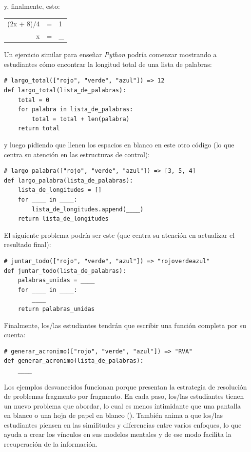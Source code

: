\noindent
y, finalmente, esto:

\begin{center}
\begin{tabular}{rcl}
  (2x + 8)/4    & = &    1    \\
   x        & = &    \_
\end{tabular}
\end{center}

Un ejercicio similar para enseñar \emph{Python} podría comenzar mostrando a estudiantes
cómo encontrar la longitud total de una lista de palabras:

\begin{verbatim}
# largo_total(["rojo", "verde", "azul"]) => 12
def largo_total(lista_de_palabras):
    total = 0
    for palabra in lista_de_palabras:
        total = total + len(palabra)
    return total
\end{verbatim}

\noindent

y luego pidiendo que llenen los espacios en blanco en este otro código
(lo que centra su atención en las estructuras de control):


\begin{verbatim}
# largo_palabra(["rojo", "verde", "azul"]) => [3, 5, 4]
def largo_palabra(lista_de_palabras):
    lista_de_longitudes = []
    for ____ in ____:
        lista_de_longitudes.append(____)
    return lista_de_longitudes
\end{verbatim}

El siguiente problema podría ser este
(que centra su atención en actualizar el resultado final):

\begin{verbatim}
# juntar_todo(["rojo", "verde", "azul"]) => "rojoverdeazul"
def juntar_todo(lista_de_palabras):
    palabras_unidas = ____
    for ____ in ____:
        ____
    return palabras_unidas
\end{verbatim}

Finalmente, los/las estudiantes tendrán que escribir una función completa por su cuenta:

\begin{verbatim}
# generar_acronimo(["rojo", "verde", "azul"]) => "RVA"
def generar_acronimo(lista_de_palabras):
    ____
\end{verbatim}

Los ejemplos desvanecidos funcionan porque
presentan la estrategia de resolución de problemas fragmento por fragmento.
En cada paso,
los/las estudiantes tienen un nuevo problema que abordar,
lo cual es menos intimidante que una pantalla en blanco o una hoja de papel en blanco ().
También anima a que los/las estudiantes piensen en las similitudes y diferencias entre varios enfoques,
lo que ayuda a crear los vínculos en sus modelos mentales y de ese modo facilita la recuperación de la información.

